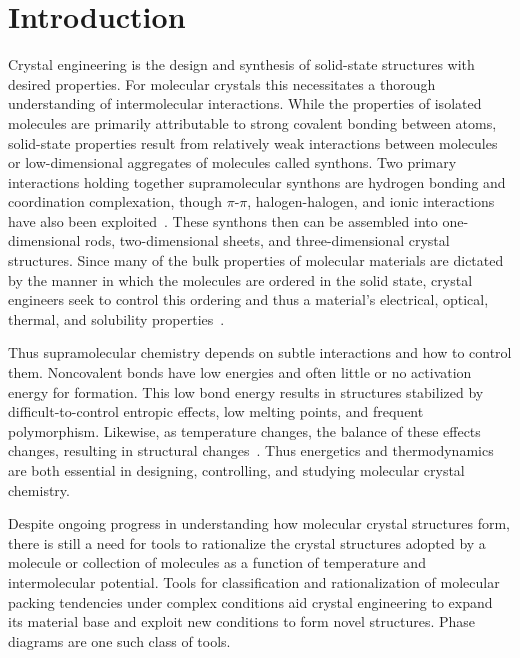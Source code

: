 \documentclass[preprint]{iucr}              %
\begin{document}
\pagebreak

\section{Introduction}

Crystal engineering is the design and synthesis of solid-state structures with
desired properties.  For molecular crystals this necessitates a thorough
understanding of intermolecular interactions.  While the properties of
isolated molecules are primarily attributable to strong covalent bonding
between atoms, solid-state properties result from relatively weak interactions
between molecules or low-dimensional aggregates of molecules called synthons. 
Two primary interactions holding together supramolecular synthons are hydrogen
bonding and coordination complexation, though $\pi$-$\pi$, halogen-halogen, and
ionic interactions have also been exploited~\cite{Thalladi96}. These synthons
then can be assembled into one-dimensional rods, two-dimensional sheets, and
three-dimensional crystal structures. Since many of the bulk properties of
molecular materials are dictated by the manner in which the molecules are
ordered in the solid state, crystal engineers seek to control this ordering and
thus a material's electrical, optical, thermal, and solubility
properties~\cite{Desiraju89,Braga99,Bassoul00,Lommerse00,Holman01b,Moulton01}.

Thus supramolecular chemistry depends on subtle interactions and how to control
them.  Noncovalent bonds have low energies and often little or no activation
energy for formation. This low bond energy results in structures stabilized by
difficult-to-control entropic effects, low melting points, and frequent
polymorphism. Likewise, as temperature changes, the balance of these effects
changes, resulting in structural changes~\cite{Neumann03}.  Thus energetics and
thermodynamics are both essential in designing, controlling, and studying
molecular crystal chemistry. 

Despite ongoing progress in understanding how molecular crystal structures form,
there is still a need for tools to rationalize the crystal structures adopted by
a molecule or collection of molecules as a function of temperature and
intermolecular potential.  Tools for classification and rationalization of
molecular packing tendencies under complex conditions aid crystal engineering to
expand its material base and exploit new conditions to form novel structures. 
Phase diagrams are one such class of tools.
\end{document}
